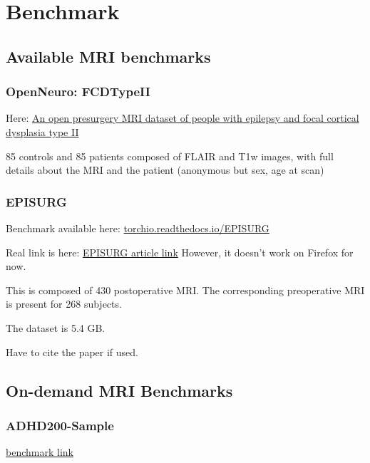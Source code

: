 \chapter{Benchmark}

\section{Available MRI benchmarks}

\subsection{OpenNeuro: FCDTypeII}

Here: \href{https://openneuro.org/datasets/ds004199/versions/1.0.6}{An open presurgery MRI dataset of people with epilepsy and focal cortical dysplasia type II}

85 controls and 85 patients composed of FLAIR and T1w images, with full details about the MRI and the patient (anonymous but sex, age at scan)

\subsection{EPISURG}

Benchmark available here: \href{https://torchio.readthedocs.io/_modules/torchio/datasets/episurg.html#EPISURG}{torchio.readthedocs.io/EPISURG}

Real link is here: \href{https://rdr.ucl.ac.uk/articles/dataset/EPISURG_a_dataset_of_postoperative_magnetic_resonance_images_MRI_for_quantitative_analysis_of_resection_neurosurgery_for_refractory_epilepsy/9996158/1?file=26153588}{EPISURG article link}
However, it doesn't work on Firefox for now.

This is composed of 430 postoperative MRI. The corresponding preoperative MRI is present for 268 subjects.

The dataset is 5.4 GB.

Have to cite the paper if used.

\section{On-demand MRI Benchmarks}

\subsection{ADHD200-Sample}

\href{https://fcon_1000.projects.nitrc.org/indi/adhd200/}{benchmark link}

